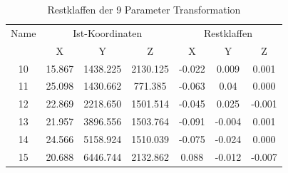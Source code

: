 \begin{table}[h]\label{tab:restklaffen9p}
\centering
\caption{Restklaffen der 9 Parameter Transformation}

\begin{tabular}{ccccccc}
\toprule
\multicolumn{1}{p{1.5cm}|}{Name} &
\multicolumn{3}{c|}{Ist-Koordinaten} &
\multicolumn{3}{c}{Restklaffen} \\
\multicolumn{1}{p{2cm}|}{} &
\multicolumn{1}{p{2cm}|}{X} &
\multicolumn{1}{p{2cm}|}{Y} &
\multicolumn{1}{p{2cm}|}{Z} &
\multicolumn{1}{p{2cm}|}{X} &
\multicolumn{1}{p{2cm}|}{Y} &
\multicolumn{1}{p{2cm}}{Z} \\
\midrule

\multicolumn{1}{p{2cm}|}{10} &
\multicolumn{1}{p{2cm}|}{15.867} &
\multicolumn{1}{p{2cm}|}{1438.225} &
\multicolumn{1}{p{2cm}|}{2130.125} &
\multicolumn{1}{p{2cm}|}{-0.022} &
\multicolumn{1}{p{2cm}|}{0.009} &
\multicolumn{1}{p{2cm}}{0.001} \\

\multicolumn{1}{p{2cm}|}{11} &
\multicolumn{1}{p{2cm}|}{25.098} &
\multicolumn{1}{p{2cm}|}{1430.662} &
\multicolumn{1}{p{2cm}|}{771.385} &
\multicolumn{1}{p{2cm}|}{-0.063} &
\multicolumn{1}{p{2cm}|}{0.04} &
\multicolumn{1}{p{2cm}}{0.000} \\

\multicolumn{1}{p{2cm}|}{12} &
\multicolumn{1}{p{2cm}|}{22.869} &
\multicolumn{1}{p{2cm}|}{2218.650} &
\multicolumn{1}{p{2cm}|}{1501.514} &
\multicolumn{1}{p{2cm}|}{-0.045} &
\multicolumn{1}{p{2cm}|}{0.025} &
\multicolumn{1}{p{2cm}}{-0.001} \\

\multicolumn{1}{p{2cm}|}{13} &
\multicolumn{1}{p{2cm}|}{21.957} &
\multicolumn{1}{p{2cm}|}{3896.556} &
\multicolumn{1}{p{2cm}|}{1503.764} &
\multicolumn{1}{p{2cm}|}{-0.091} &
\multicolumn{1}{p{2cm}|}{-0.004} &
\multicolumn{1}{p{2cm}}{0.001} \\

\multicolumn{1}{p{2cm}|}{14} &
\multicolumn{1}{p{2cm}|}{24.566} &
\multicolumn{1}{p{2cm}|}{5158.924} &
\multicolumn{1}{p{2cm}|}{1510.039} &
\multicolumn{1}{p{2cm}|}{-0.075} &
\multicolumn{1}{p{2cm}|}{-0.024} &
\multicolumn{1}{p{2cm}}{0.000} \\

\multicolumn{1}{p{2cm}|}{15} &
\multicolumn{1}{p{2cm}|}{20.688} &
\multicolumn{1}{p{2cm}|}{6446.744} &
\multicolumn{1}{p{2cm}|}{2132.862} &
\multicolumn{1}{p{2cm}|}{0.088} &
\multicolumn{1}{p{2cm}|}{-0.012} &
\multicolumn{1}{p{2cm}}{-0.007} \\


\end{tabular}
\end{table}
